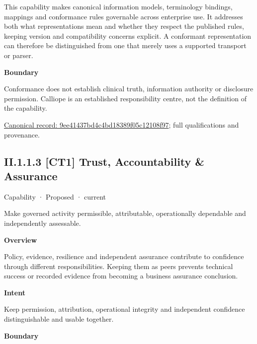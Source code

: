 This capability makes canonical information models, terminology bindings, mappings and conformance rules governable across enterprise use. It addresses both what representations mean and whether they respect the published rules, keeping version and compatibility concerns explicit. A conformant representation can therefore be distinguished from one that merely uses a supported transport or parser.



\textbf{Boundary}



Conformance does not establish clinical truth, information authority or disclosure permission. Calliope is an established responsibility centre, not the definition of the capability.


{\footnotesize \href{../../../../continuum/strategy/capability/9ee41437bd4c4bd18389f05c12108f97.md}{Canonical record: 9ee41437bd4c4bd18389f05c12108f97}; full qualifications and provenance.}\par
\subsection*{II.1.1.3 [CT1] Trust, Accountability \& Assurance}
\label{navigation:II.1.1.3}

\label{element:321de197612f49089d8b4a4cc1a2e003}
{\small Capability · Proposed · current}\par

Make governed activity permissible, attributable, operationally dependable and independently assessable.



\textbf{Overview}



Policy, evidence, resilience and independent assurance contribute to confidence through different responsibilities. Keeping them as peers prevents technical success or recorded evidence from becoming a business assurance conclusion.



\textbf{Intent}



Keep permission, attribution, operational integrity and independent confidence distinguishable and usable together.



\textbf{Boundary}



